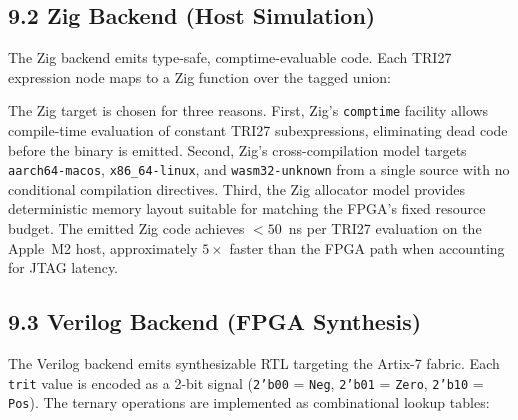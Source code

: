 \subsection{9.2 Zig Backend (Host
Simulation)}\label{fa_27:zig-backend}

The Zig backend emits type-safe, comptime-evaluable
code. Each TRI27 expression node maps to a Zig
function over the tagged union:

\begin{Shaded}
\begin{Highlighting}[]
\end{Highlighting}
\end{Shaded}

The Zig target is chosen for three reasons.
First, Zig's \texttt{comptime} facility allows
compile-time evaluation of constant TRI27
subexpressions, eliminating dead code before the
binary is emitted. Second, Zig's cross-compilation
model targets \texttt{aarch64-macos},
\texttt{x86\_64-linux}, and
\texttt{wasm32-unknown} from a single source with
no conditional compilation directives. Third, the
Zig allocator model provides deterministic memory
layout suitable for matching the FPGA's fixed
resource budget. The emitted Zig code achieves
$< 50$~ns per TRI27 evaluation on the Apple~M2
host, approximately $5\times$ faster than the FPGA
path when accounting for JTAG latency.

\subsection{9.3 Verilog Backend (FPGA
Synthesis)}\label{fa_27:verilog-backend}

The Verilog backend emits synthesizable RTL
targeting the Artix-7 fabric. Each \texttt{trit}
value is encoded as a 2-bit signal
(\texttt{2'b00} = \texttt{Neg}, \texttt{2'b01} =
\texttt{Zero}, \texttt{2'b10} = \texttt{Pos}).
The ternary operations are implemented as
combinational lookup tables:

\begin{Shaded}
\begin{Highlighting}[]
\end{Highlighting}
\end{Shaded}

